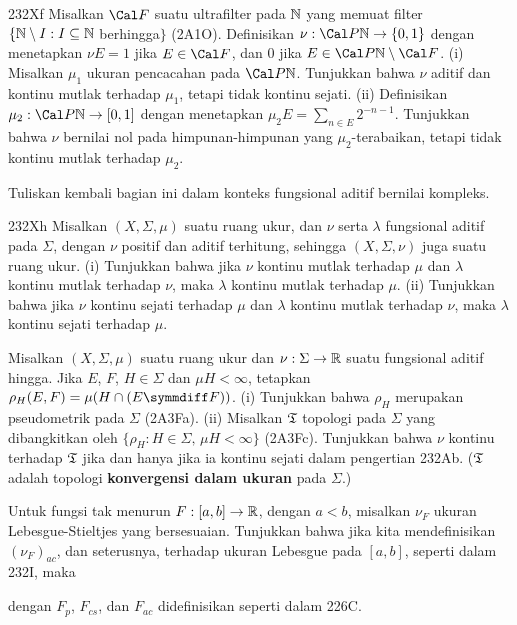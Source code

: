 {\spheader 232Xf Misalkan $\Cal F$ suatu ultrafilter pada $\Bbb N$ yang
memuat filter $\{\Bbb N\setminus I:I\subseteq\Bbb N$ berhingga$\}$
(2A1O). Definisikan $\nu:\Cal P\Bbb N\to\{0,1\}$ dengan
menetapkan $\nu E=1$ jika $E\in\Cal F$, dan $0$ jika
$E\in\Cal P\Bbb N\setminus\Cal F$.
(i) Misalkan $\mu_1$ ukuran pencacahan pada $\Cal P\Bbb N$. Tunjukkan
bahwa $\nu$ aditif dan kontinu mutlak terhadap $\mu_1$, tetapi tidak
kontinu sejati. (ii) Definisikan $\mu_2:\Cal P\Bbb N\to[0,1]$ dengan
menetapkan $\mu_2E=\sum_{n\in E}2^{-n-1}$. Tunjukkan bahwa $\nu$ bernilai
nol pada himpunan-himpunan yang $\mu_2$-terabaikan, tetapi tidak kontinu
mutlak terhadap $\mu_2$.

 Tuliskan kembali bagian ini dalam konteks
fungsional aditif bernilai kompleks.

\spheader 232Xh Misalkan $(X,\Sigma,\mu)$ suatu ruang ukur, dan $\nu$
serta $\lambda$ fungsional aditif pada $\Sigma$, dengan $\nu$ positif dan
aditif terhitung, sehingga $(X,\Sigma,\nu)$ juga suatu ruang ukur.
(i) Tunjukkan bahwa jika $\nu$ kontinu mutlak terhadap $\mu$ dan
$\lambda$ kontinu mutlak terhadap $\nu$, maka $\lambda$ kontinu mutlak
terhadap $\mu$. (ii) Tunjukkan bahwa jika $\nu$ kontinu sejati terhadap
$\mu$ dan $\lambda$ kontinu mutlak terhadap $\nu$, maka $\lambda$
kontinu sejati terhadap $\mu$.

 Misalkan $(X,\Sigma,\mu)$ suatu
ruang ukur dan $\nu:\Sigma\to\Bbb R$ suatu fungsional aditif hingga.
Jika $E$, $F$, $H\in\Sigma$ dan $\mu H<\infty$, tetapkan
$\rho_H(E,F)=\mu(H\cap(E\symmdiff F))$. (i) Tunjukkan bahwa $\rho_H$
merupakan pseudometrik pada $\Sigma$ (2A3Fa). (ii)
Misalkan $\frak T$ topologi pada $\Sigma$ yang dibangkitkan oleh
$\{\rho_H:H\in\Sigma,\,\mu H<\infty\}$ (2A3Fc). Tunjukkan bahwa $\nu$
kontinu terhadap $\frak T$ jika dan hanya jika ia kontinu sejati
dalam pengertian 232Ab.
($\frak T$ adalah topologi {\bf konvergensi dalam ukuran} pada $\Sigma$.)

 Untuk fungsi tak menurun
$F:[a,b]\to\Bbb R$, dengan $a<b$, misalkan $\nu_F$ ukuran
Lebesgue-Stieltjes yang bersesuaian. Tunjukkan bahwa jika kita
mendefinisikan $(\nu_F)_{ac}$, dan seterusnya, terhadap ukuran Lebesgue
pada $[a,b]$, seperti dalam 232I, maka


\noindent dengan $F_p$, $F_{cs}$, dan $F_{ac}$ didefinisikan seperti
dalam 226C.

}
